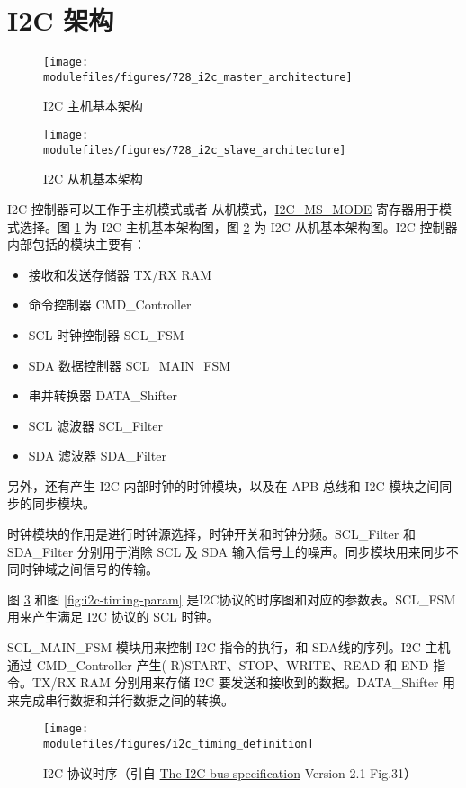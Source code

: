 \documentclass[main\_\_CN.tex]{subfiles}
\begin{document}
\section{I2C 架构}
\begin{figure}[H]
    \centering
    \texttt{[image: \\modulefiles/figures/728\_i2c\_master\_architecture]}
    \caption{I2C 主机基本架构}
    \label{fig:i2c-master}
\end{figure}

\begin{figure}[H]
    \centering
    \texttt{[image: \\modulefiles/figures/728\_i2c\_slave\_architecture]}
    \caption{I2C 从机基本架构}
    \label{fig:i2c-slave}
\end{figure}

I2C 控制器可以工作于主机模式或者 从机模式，\hyperref[fielddesc:I2CMSMODE]{I2C\_MS\_MODE} 寄存器用于模式选择。图 \ref{fig:i2c-master} 为 I2C 主机基本架构图，图 \ref{fig:i2c-slave} 为 I2C 从机基本架构图。I2C 控制器内部包括的模块主要有：
\begin{itemize}
    \item 接收和发送存储器 TX/RX RAM
    \item 命令控制器 CMD\_Controller
    \item SCL 时钟控制器 SCL\_FSM
    \item SDA 数据控制器 SCL\_MAIN\_FSM
    \item 串并转换器 DATA\_Shifter
    \item SCL 滤波器 SCL\_Filter
    \item SDA 滤波器 SDA\_Filter
\end{itemize}

另外，还有产生 I2C 内部时钟的时钟模块，以及在 APB 总线和 I2C 模块之间同步的同步模块。

时钟模块的作用是进行时钟源选择，时钟开关和时钟分频。SCL\_Filter 和 SDA\_Filter 分别用于消除 SCL 及 SDA 输入信号上的噪声。同步模块用来同步不同时钟域之间信号的传输。

图 \ref{fig:i2c-protocol-timing} 和图 \ref{fig:i2c-timing-param} 是I2C协议的时序图和对应的参数表。SCL\_FSM 用来产生满足 I2C 协议的 SCL 时钟。

SCL\_MAIN\_FSM 模块用来控制 I2C 指令的执行，和 SDA线的序列。I2C 主机通过 CMD\_Controller 产生( R)START、STOP、WRITE、READ 和 END 指令。TX/RX RAM 分别用来存储 I2C 要发送和接收到的数据。DATA\_Shifter 用来完成串行数据和并行数据之间的转换。

\begin{figure}[H]
    \centering
    \texttt{[image: \\modulefiles/figures/i2c\_timing\_definition]}
    \caption{I2C 协议时序（引自 \href{https://www.csd.uoc.gr/~hy428/reading/i2c_spec.pdf}{The I2C-bus specification} Version 2.1 Fig.31）}
    \label{fig:i2c-protocol-timing}
\end{figure}
\end{document}
